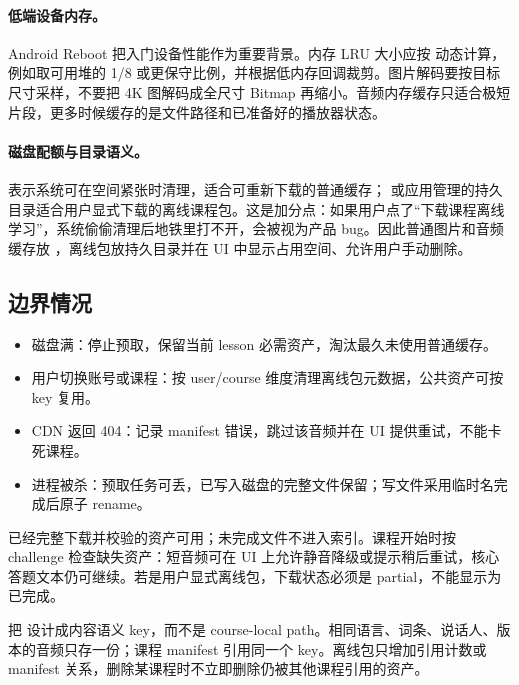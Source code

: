 \paragraph{低端设备内存。} \srcofficial Android Reboot 把入门设备性能作为重要背景。\srcinferred 内存 LRU 大小应按  动态计算，例如取可用堆的 1/8 或更保守比例，并根据低内存回调裁剪。图片解码要按目标尺寸采样，不要把 4K 图解码成全尺寸 Bitmap 再缩小。音频内存缓存只适合极短片段，更多时候缓存的是文件路径和已准备好的播放器状态。

\paragraph{磁盘配额与目录语义。}  表示系统可在空间紧张时清理，适合可重新下载的普通缓存； 或应用管理的持久目录适合用户显式下载的离线课程包。\srcinferred 这是加分点：如果用户点了“下载课程离线学习”，系统偷偷清理后地铁里打不开，会被视为产品 bug。因此普通图片和音频缓存放 ，离线包放持久目录并在 UI 中显示占用空间、允许用户手动删除。

\subsection{边界情况}

\begin{itemize}
  \item 磁盘满：停止预取，保留当前 lesson 必需资产，淘汰最久未使用普通缓存。
  \item 用户切换账号或课程：按 user/course 维度清理离线包元数据，公共资产可按 key 复用。
  \item CDN 返回 404：记录 manifest 错误，跳过该音频并在 UI 提供重试，不能卡死课程。
  \item 进程被杀：预取任务可丢，已写入磁盘的完整文件保留；写文件采用临时名完成后原子 rename。
\end{itemize}

\begin{followup}
已经完整下载并校验的资产可用；未完成文件不进入索引。课程开始时按 challenge 检查缺失资产：短音频可在 UI 上允许静音降级或提示稍后重试，核心答题文本仍可继续。若是用户显式离线包，下载状态必须是 partial，不能显示为已完成。
\end{followup}

\begin{followup}
把  设计成内容语义 key，而不是 course-local path。相同语言、词条、说话人、版本的音频只存一份；课程 manifest 引用同一个 key。离线包只增加引用计数或 manifest 关系，删除某课程时不立即删除仍被其他课程引用的资产。
\end{followup}

